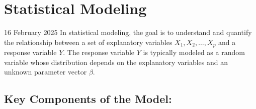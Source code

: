 \documentclass{article}
\begin{document}
\section*{Statistical Modeling}

16 February 2025
\newline
In statistical modeling, the goal is to understand and quantify the relationship between a set of explanatory variables \( X_1, X_2, \dots, X_p \) and a response variable \( Y \). The response variable \( Y \) is typically modeled as a random variable whose distribution depends on the explanatory variables and an unknown parameter vector \( \beta \).

\subsection*{Key Components of the Model:}
\end{document}
